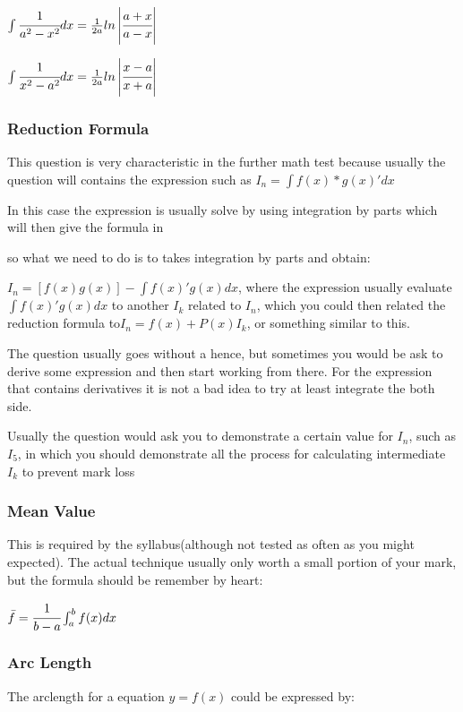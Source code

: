 \documentclass[]{article}
\begin{document}
\(\int{\cfrac{1}{a^2 - x^2}}dx = \frac{1}{2a} ln \left|{\cfrac{a+x}{a-x}}\right|\)

\(\int{\cfrac{1}{x^2-a^2}}dx = \frac{1}{2a} ln \left|\cfrac{x-a}{x+a}\right|\)

\subsubsection{Reduction Formula}\label{header-n1045}

This question is very characteristic in the further math test because
usually the question will contains the expression such as
\(I_n= \int f(x) * g(x)'dx\)

In this case the expression is usually solve by using integration by
parts which will then give the formula in

so what we need to do is to takes integration by parts and obtain:

\(I_n = [f(x)g(x)] - \int{f(x)'g(x)}dx\), where the expression usually
evaluate \(\int f(x)'g(x) dx\) to another \(I_k\) related to \(I_n\),
which you could then related the reduction formula
to\(I_n = f(x) + P(x)I_k\), or something similar to this.

The question usually goes without a hence, but sometimes you would be
ask to derive some expression and then start working from there. For the
expression that contains derivatives it is not a bad idea to try at
least integrate the both side.

Usually the question would ask you to demonstrate a certain value for
\(I_n\), such as \(I_5\), in which you should demonstrate all the
process for calculating intermediate \(I_k\) to prevent mark loss

\subsubsection{Mean Value}\label{header-n1058}

This is required by the syllabus(although not tested as often as you
might expected). The actual technique usually only worth a small portion
of your mark, but the formula should be remember by heart:

\(\bar{f} = \cfrac{1}{b-a} \int_a^b f(x) dx\)

\subsubsection{Arc Length}\label{header-n1063}

The arclength for a equation \(y = f(x)\) could be expressed by:
\end{document}

